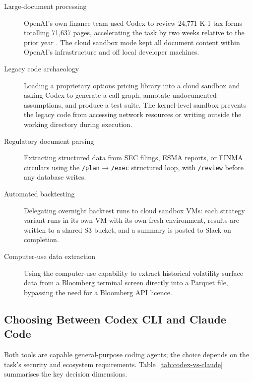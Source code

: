 \begin{description}
  \item[Large-document processing] OpenAI's own finance team used Codex to
        review 24{,}771 K-1 tax forms totalling 71{,}637 pages, accelerating
        the task by two weeks relative to the prior year \citep{openai2025codex}.
        The cloud sandbox mode kept all document content within OpenAI's
        infrastructure and off local developer machines.

  \item[Legacy code archaeology] Loading a proprietary options pricing library
        into a cloud sandbox and asking Codex to generate a call graph,
        annotate undocumented assumptions, and produce a test suite.  The
        kernel-level sandbox prevents the legacy code from accessing network
        resources or writing outside the working directory during execution.

  \item[Regulatory document parsing] Extracting structured data from SEC
        filings, ESMA reports, or FINMA circulars using the \texttt{/plan} →
        \texttt{/exec} structured loop, with \texttt{/review} before any
        database writes.

  \item[Automated backtesting] Delegating overnight backtest runs to cloud
        sandbox VMs: each strategy variant runs in its own VM with its own
        fresh environment, results are written to a shared S3 bucket, and a
        summary is posted to Slack on completion.

  \item[Computer-use data extraction] Using the computer-use capability to
        extract historical volatility surface data from a Bloomberg terminal
        screen directly into a Parquet file, bypassing the need for a Bloomberg
        API licence.
\end{description}

\subsection{Choosing Between Codex CLI and Claude Code}
\label{app:codex:comparison}

Both tools are capable general-purpose coding agents; the choice depends on
the task's security and ecosystem requirements.
Table~\ref{tab:codex-vs-claude} summarises the key decision dimensions.

